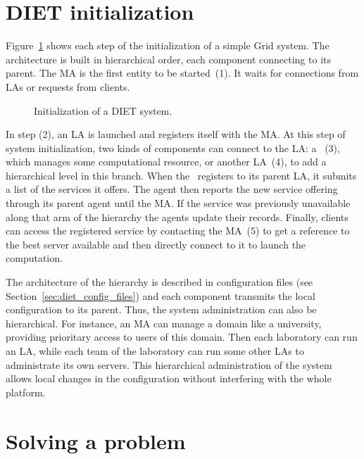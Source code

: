 \section{DIET initialization}
\label{init}

Figure~\ref{fig:init} shows each step of the initialization of a
simple Grid system. The architecture is built in hierarchical order,
each component connecting to its parent. The MA is the first entity to
be started~(1). It waits for connections from LAs or requests from
clients.

\begin{figure}[hbt]
  \begin{center}
    \caption{Initialization of a DIET system.}
    \label{fig:init}
  \end{center}
\end{figure}

In step (2), an LA is launched and registers itself with the MA.
At this step of system initialization, two kinds of components can
connect to
the LA: a \sed ~(3), which manages some computational resource, or
another LA~(4), to add a hierarchical level in this branch. When the
\sed\ registers to its parent LA, it submits a list of the services it
offers.  The agent then reports the new service offering through its
parent agent until the MA.  If the service was previously unavailable
along that arm of the hierarchy the agents update their records.
Finally, clients can access the registered service by contacting 
the MA~(5) to get a reference to the best server available and then
directly connect to it to launch the computation.

The architecture of the hierarchy is described in configuration files
(see Section~\ref{sec:diet_config_files})
and each component transmits the local configuration to its
parent. Thus, the system administration can also be hierarchical. For
instance, an MA can manage a domain like a university, providing
prioritary access to users of this domain. Then each laboratory can
run an LA, while each team of the laboratory can run some other LAs to
administrate its own servers. This hierarchical administration of the
system allows local changes in the configuration without interfering
with the whole platform.



\section{Solving a problem}
\label{sec:solvepb}

